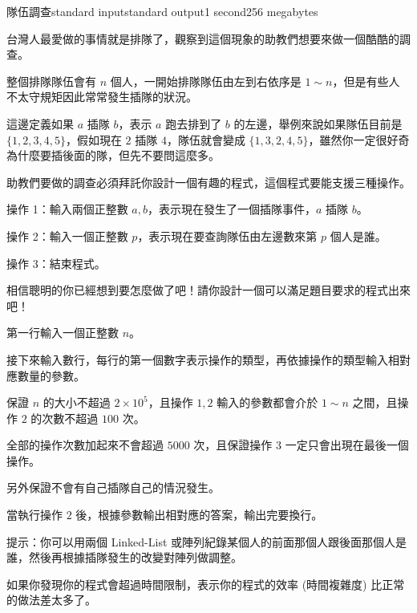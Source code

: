 \begin{problem}{隊伍調查}{standard input}{standard output}{1 second}{256 megabytes}

台灣人最愛做的事情就是排隊了，觀察到這個現象的助教們想要來做一個酷酷的調查。

整個排隊隊伍會有 $n$ 個人，一開始排隊隊伍由左到右依序是 $1 \sim n$，但是有些人不太守規矩因此常常發生插隊的狀況。

這邊定義如果 $a$ 插隊 $b$，表示 $a$ 跑去排到了 $b$ 的左邊，舉例來說如果隊伍目前是 $\{1,2,3,4,5\}$，假如現在 $2$ 插隊 $4$，隊伍就會變成 $\{1,3,2,4,5\}$，雖然你一定很好奇為什麼要插後面的隊，但先不要問這麼多。

助教們要做的調查必須拜託你設計一個有趣的程式，這個程式要能支援三種操作。

操作 1：輸入兩個正整數 $a,b$，表示現在發生了一個插隊事件，$a$ 插隊 $b$。

操作 2：輸入一個正整數 $p$，表示現在要查詢隊伍由左邊數來第 $p$ 個人是誰。

操作 3：結束程式。

相信聰明的你已經想到要怎麼做了吧！請你設計一個可以滿足題目要求的程式出來吧！

\InputFile
第一行輸入一個正整數 $n$。

接下來輸入數行，每行的第一個數字表示操作的類型，再依據操作的類型輸入相對應數量的參數。

保證 $n$ 的大小不超過 $2 \times 10^5$，且操作 $1,2$ 輸入的參數都會介於 $1 \sim n$ 之間，且操作 $2$ 的次數不超過 $100$ 次。

全部的操作次數加起來不會超過 $5000$ 次，且保證操作 $3$ 一定只會出現在最後一個操作。

另外保證不會有自己插隊自己的情況發生。

\OutputFile
當執行操作 $2$ 後，根據參數輸出相對應的答案，輸出完要換行。

\Example

\begin{example}
%
\end{example}

\Note
提示：你可以用兩個 Linked-List 或陣列紀錄某個人的前面那個人跟後面那個人是誰，然後再根據插隊發生的改變對陣列做調整。

如果你發現你的程式會超過時間限制，表示你的程式的效率 (時間複雜度) 比正常的做法差太多了。

\end{problem}

